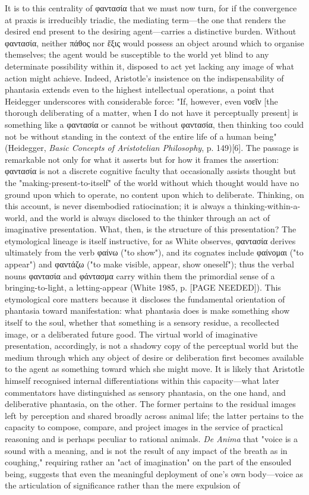 \documentclass{article}
\begin{document}
It is to this centrality of φαντασία that we must now turn, for if the convergence at praxis is irreducibly triadic, the mediating term—the one that renders the desired end present to the desiring agent—carries a distinctive burden. Without φαντασία, neither πάθος nor ἕξις would possess an object around which to organise themselves; the agent would be susceptible to the world yet blind to any determinate possibility within it, disposed to act yet lacking any image of what action might achieve. Indeed, Aristotle's insistence on the indispensability of phantasia extends even to the highest intellectual operations, a point that Heidegger underscores with considerable force: "If, however, even νοεῖν [the thorough deliberating of a matter, when I do not have it perceptually present] is something like a φαντασία or cannot be without φαντασία, then thinking too could not be without standing in the context of the entire life of a human being" (Heidegger, \textit{Basic Concepts of Aristotelian Philosophy}, p. 149)[6]. The passage is remarkable not only for what it asserts but for how it frames the assertion: φαντασία is not a discrete cognitive faculty that occasionally assists thought but the "making-present-to-itself" of the world without which thought would have no ground upon which to operate, no content upon which to deliberate. Thinking, on this account, is never disembodied ratiocination; it is always a thinking-within-a-world, and the world is always disclosed to the thinker through an act of imaginative presentation. What, then, is the structure of this presentation? The etymological lineage is itself instructive, for as White observes, φαντασία derives ultimately from the verb φαίνω ("to show"), and its cognates include φαίνομαι ("to appear") and φαντάζω ("to make visible, appear, show oneself"); thus the verbal nouns φαντασία and φάντασμα carry within them the primordial sense of a bringing-to-light, a letting-appear (White 1985, p. [PAGE NEEDED]). This etymological core matters because it discloses the fundamental orientation of phantasia toward manifestation: what phantasia does is make something show itself to the soul, whether that something is a sensory residue, a recollected image, or a deliberated future good. The virtual world of imaginative presentation, accordingly, is not a shadowy copy of the perceptual world but the medium through which any object of desire or deliberation first becomes available to the agent as something toward which she might move. It is likely that Aristotle himself recognised internal differentiations within this capacity—what later commentators have distinguished as sensory phantasia, on the one hand, and deliberative phantasia, on the other. The former pertains to the residual images left by perception and shared broadly across animal life; the latter pertains to the capacity to compose, compare, and project images in the service of practical reasoning and is perhaps peculiar to rational animals. \textit{De Anima} that "voice is a sound with a meaning, and is not the result of any impact of the breath as in coughing," requiring rather an "act of imagination" on the part of the ensouled being, suggests that even the meaningful deployment of one's own body—voice as the articulation of significance rather than the mere expulsion of 
\end{document}
